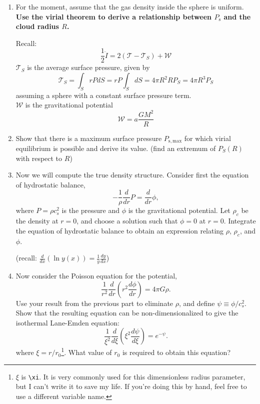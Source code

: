 \documentclass{article}
\begin{document}
\begin{enumerate}
\item For the moment, assume that the gas density inside the sphere is uniform.
    \textbf{Use the virial theorem to derive a relationship between $P_{\mathrm{s}}$
    and the cloud radius $R$. }

    Recall:
    $$\frac{1}{2}\ddot{I} = 2 (\mathcal{T} - \mathcal{T}_S) + \mathcal{W}$$
    $\mathcal{T}_S$ is the average surface pressure, given by
    $$\mathcal{T}_S = \int_S r P dS = r P \int_S dS = 4 \pi R^2 R P_S = 4 \pi R^3 P_S$$
    assuming a sphere with a constant surface pressure term. \\
    $\mathcal{W}$ is the gravitational potential
    $$\mathcal{W} = a \frac{GM^2}{R}$$

\item Show that there is a maximum surface pressure $P_{\mathrm{s,max}}$ for
    which virial equilibrium is possible and derive its value.
    (find an extremum of $P_S(R)$ with respect to $R$)


\item Now we will compute the true density structure. Consider first the equation of hydrostatic balance,
\begin{displaymath}
-\frac{1}{\rho}\frac{d}{dr} P = \frac{d}{dr} \phi,
\end{displaymath}
where $P = \rho c_s^2$ is the pressure and $\phi$ is the gravitational
potential. Let $\rho_c$ be the density at $r=0$, and choose a solution such that
$\phi = 0$ at $r=0$. Integrate the equation of hydrostatic balance to obtain an
expression relating $\rho$, $\rho_c$, and $\phi$.

(recall: $\frac{d }{dx}\left(\ln y(x)\right) = \frac{1}{y} \frac{d y}{dx}$)

\item Now consider the Poisson equation for the potential,
\begin{displaymath}
\frac{1}{r^2}\frac{d}{dr}\left(r^2 \frac{d\phi}{dr}\right) = 4 \pi G \rho.
\end{displaymath}
Use your result from the previous part to eliminate $\rho$, and define $\psi \equiv \phi/c_s^2$. Show that the resulting equation can be non-dimensionalized to give the isothermal Lane-Emden equation:
\begin{displaymath}
\frac{1}{\xi^2}\frac{d}{d\xi}\left(\xi^2 \frac{d\psi}{d\xi}\right) = e^{-\psi}.
\end{displaymath}
where $\xi = r/r_0$\footnote{$\xi$ is \texttt{\textbackslash xi}.  It is very commonly used
for this dimensionless radius parameter, but I can't write it to save my life.
If you're doing this by hand, feel free to use a different variable name.}.
What value of $r_0$ is required to obtain this equation?
\label{item:r0}



\end{enumerate}
\end{document}
